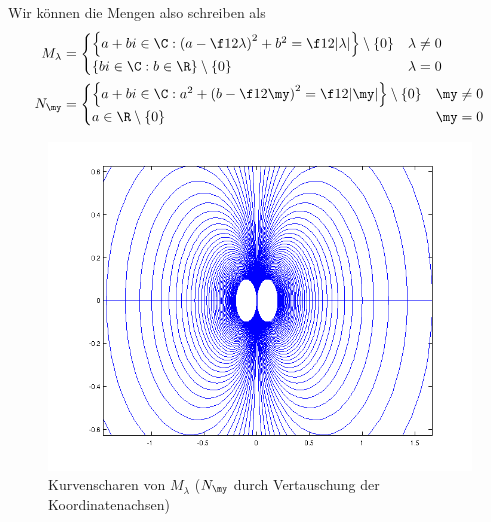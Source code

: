 \documentclass[a4paper]{scrartcl}
\begin{document}
\begin{aufgabe}
		Wir können die Mengen also schreiben als
		\begin{align*}
			M_\lambda &= \begin{cases}
				\left\{a+bi\in \C : \left(a-\f 1{2\lambda}\right)^2+b^2=\f1{2|\lambda|}\right\} \setminus \{0\} & \lambda\neq 0\\
												\{bi\in \C : b\in \R\} \setminus \{0\} & \lambda=0
			\end{cases}\\
			N_\my &= \begin{cases}
				\left\{a+bi\in \C : a^2+\left(b-\f 1{2\my}\right)^2=\f1{2|\my|}\right\} \setminus \{0\} & \my\neq 0\\
												 a\in \R \setminus \{0\} & \my=0
			\end{cases}
		\end{align*}
		\begin{figure}[h]
			\centering
			\caption{Kurvenscharen von $M_\lambda$ ($N_\my$ durch Vertauschung der Koordinatenachsen)}
			\includegraphics[scale=0.6]{ana3_1_1}
		\end{figure}
	\end{aufgabe}
\end{document}
